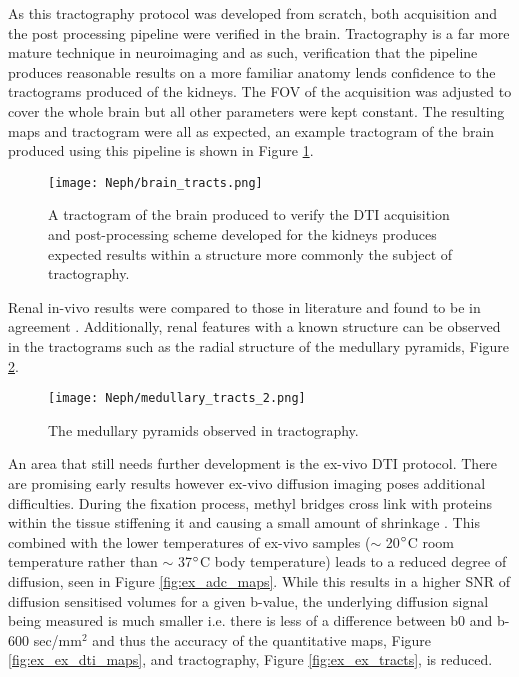 As this tractography protocol was developed from scratch, both acquisition and the post processing pipeline were verified in the brain. Tractography is a far more mature technique in neuroimaging and as such, verification that the pipeline produces reasonable results on a more familiar anatomy lends confidence to the tractograms produced of the kidneys. The \ac{FOV} of the acquisition was adjusted to cover the whole brain but all other parameters were kept constant. The resulting maps and tractogram were all as expected, an example tractogram of the brain produced using this pipeline is shown in Figure \ref{fig:ex_dti_brain_tracts}.

\begin{figure}[H]
	\centering
	\texttt{[image: Neph/brain\_tracts.png]}
	\caption{A tractogram of the brain produced to verify the \ac{DTI} acquisition and post-processing scheme developed for the kidneys produces expected results within a structure more commonly the subject of tractography.}
	\label{fig:ex_dti_brain_tracts}	
\end{figure}

Renal in-vivo results were compared to those in literature and found to be in agreement \cite{gurses_diffusion_2011, jaimes_diffusion_2014, notohamiprodjo_diffusion_2010}. Additionally, renal features with a known structure can be observed in the tractograms such as the radial structure of the medullary pyramids, Figure \ref{fig:ex_dti_medulla_tracts}.

\begin{figure}[H]
	\centering
	\texttt{[image: Neph/medullary\_tracts\_2.png]} %
	\caption{The medullary pyramids observed in tractography.}
	\label{fig:ex_dti_medulla_tracts}	
\end{figure}

An area that still needs further development is the ex-vivo \ac{DTI} protocol. There are promising early results however ex-vivo diffusion imaging poses additional difficulties. During the fixation process, methyl bridges cross link with proteins within the tissue stiffening it and causing a small amount of shrinkage \cite{thavarajah_chemical_2012}. This combined with the lower temperatures of ex-vivo samples ($\sim$ 20$\degree$C room temperature rather than $\sim$ 37$\degree$C body temperature) leads to a reduced degree of diffusion, seen in Figure \ref{fig:ex_adc_maps}. While this results in a higher \ac{SNR} of diffusion sensitised volumes for a given b-value, the underlying diffusion signal being measured is much smaller i.e. there is less of a difference between b0 and b-600 sec/mm$^2$ and thus the accuracy of the quantitative maps, Figure \ref{fig:ex_ex_dti_maps}, and tractography, Figure \ref{fig:ex_ex_tracts}, is reduced.

